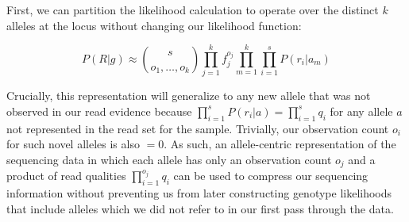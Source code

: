 \documentclass{article}
\begin{document}
First, we can partition the likelihood calculation to operate over the distinct $k$ alleles at the locus without changing our likelihood function:

\begin{equation}
P(R|g) \approx {s \choose o_1,\ldots,o_k } 
\prod_{j=1}^k { f_j^{o_j} }
\prod_{m=1}^k 
\prod_{i=1}^s P(r_i | a_m)
\end{equation}

Crucially, this representation will generalize to any new allele that was not observed in our read evidence because $\prod_{i=1}^s P(r_i | a) = \prod_{i=1}^s { q_i }$ for any allele $a$ not represented in the read set for the sample. Trivially, our observation count $o_i$ for such novel alleles is also $=0$. As such, an allele-centric representation of the sequencing data in which each allele has only an observation count $o_j$ and a product of read qualities $\prod_{i=1}^{o_j} { q_i }$ can be used to compress our sequencing information without preventing us from later constructing genotype likelihoods that include alleles which we did not refer to in our first pass through the data.
\end{document}

